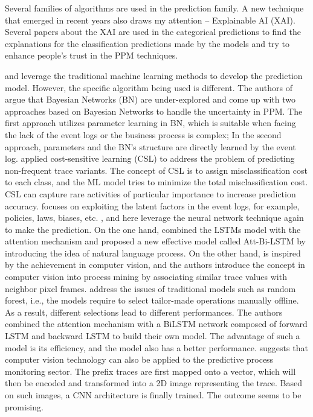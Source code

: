 \documentclass[runningheads]{llncs}
\begin{document}
		Several families of algorithms are used in the prediction family. A new technique that emerged in recent years also draws my attention -- Explainable AI (XAI). Several papers about the XAI are used in the categorical predictions to find the explanations for the classification predictions made by the models and try to enhance people's trust in the PPM techniques. 
		
		\cite{art-4} and \cite{art-26} leverage the traditional machine learning methods to develop the prediction model. However, the specific algorithm being used is different. The authors of \cite{art-4} argue that Bayesian Networks (BN) are under-explored and come up with two approaches based on Bayesian Networks to handle the uncertainty in PPM. The first approach utilizes parameter learning in BN, which is suitable when facing the lack of the event logs or the business process is complex; In the second approach, parameters and the BN's structure are directly learned by the event log. \cite{art-26} applied cost-sensitive learning (CSL) to address the problem of predicting non-frequent trace variants. The concept of CSL is to assign misclassification cost to each class, and the ML model tries to minimize the total misclassification cost. CSL can capture rare activities of particular importance to increase prediction accuracy. \cite{art-8} focuses on exploiting the latent factors in the event logs, for example, policies, laws, biases, etc. \cite{art-9}, and \cite{art-12} here leverage the neural network technique again to make the prediction. On the one hand, \cite{art-9} combined the LSTMs model with the attention mechanism and proposed a new effective model called  Att-Bi-LSTM by introducing the idea of natural language process. On the other hand, \cite{art-12} is inspired by the achievement in computer vision, and the authors introduce the concept in computer vision into process mining by associating similar trace values with neighbor pixel frames. \cite{art-9} address the issues of traditional models such as random forest, i.e., the models require to select tailor-made operations manually offline. As a result, different selections lead to different performances. The authors combined the attention mechanism with a BiLSTM network composed of forward LSTM and backward LSTM to build their own model. The advantage of such a model is its efficiency, and the model also has a better performance. \cite{art-12} suggests that computer vision technology can also be applied to the predictive process monitoring sector. The prefix traces are first mapped onto a vector, which will then be encoded and transformed into a 2D image representing the trace. Based on such images, a CNN architecture is finally trained. The outcome seems to be promising. 
		
\end{document}
